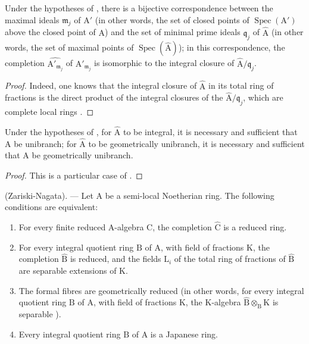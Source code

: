 \begin{corollary}[7.6.2]
\label{IV.7.6.2}
Under the hypotheses of , there is a bijective correspondence between the maximal ideals $\mathfrak{m}_j$ of $\mathrm{A}'$ (in other words, the set of closed points of $\operatorname{Spec}(\mathrm{A}')$ above the closed point of $\mathrm{A}$) and the set of minimal prime ideals $\mathfrak{q}_j$ of $\widehat{\mathrm{A}}$ (in other words, the set of maximal points of $\operatorname{Spec}(\widehat{\mathrm{A}})$); in this correspondence, the completion $\widehat{\mathrm{A}'_{\mathfrak{m}_j}}$ of $\mathrm{A}'_{\mathfrak{m}_j}$ is isomorphic to the integral closure of $\widehat{\mathrm{A}}/\mathfrak{q}_j$.
\end{corollary}

\begin{proof}
  Indeed, one knows that the integral closure of $\widehat{\mathrm{A}}$ in its total ring of fractions is the direct product of the integral closures of the $\widehat{\mathrm{A}}/\mathfrak{q}_j$, which are complete local rings .
\end{proof}

\begin{corollary}[7.6.3]
\label{IV.7.6.3}
Under the hypotheses of , for $\widehat{\mathrm{A}}$ to be integral, it is necessary and sufficient that $\mathrm{A}$ be unibranch; for $\widehat{\mathrm{A}}$ to be geometrically unibranch, it is necessary and sufficient that $\mathrm{A}$ be geometrically unibranch.
\end{corollary}

\begin{proof}
This is a particular case of .
\end{proof}

\begin{theorem}[7.6.4]
\label{IV.7.6.4}
(Zariski-Nagata). --- Let $\mathrm{A}$ be a semi-local Noetherian ring. The following conditions are equivalent:
\begin{enumerate}[label=\emph{\alph*)}]
  \item For every finite reduced $\mathrm{A}$-algebra $\mathrm{C}$, the completion $\widehat{\mathrm{C}}$ is a reduced ring.
  \item[\rm a$'$)] For every integral quotient ring $\mathrm{B}$ of $\mathrm{A}$, with field of fractions $\mathrm{K}$, the completion $\widehat{\mathrm{B}}$ is reduced, and the fields $\mathrm{L}_i$ of the total ring of fractions of $\widehat{\mathrm{B}}$ are separable extensions of $\mathrm{K}$.
  \item[\rm a$''$)] The formal fibres are geometrically reduced (in other words, for every integral quotient ring $\mathrm{B}$ of $\mathrm{A}$, with field of fractions $\mathrm{K}$, the $\mathrm{K}$-algebra $\widehat{\mathrm{B}}\otimes_\mathrm{B}\mathrm{K}$ is separable ).
  \item[\rm b)] Every integral quotient ring $\mathrm{B}$ of $\mathrm{A}$ is a Japanese ring.
\end{enumerate}
\end{theorem}

